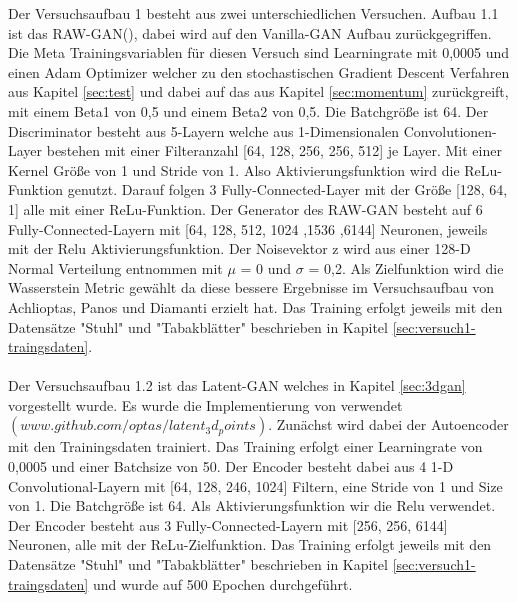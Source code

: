 \documentclass{llncs}
\begin{document}
Der Versuchsaufbau 1 besteht aus zwei unterschiedlichen Versuchen. Aufbau 1.1 ist das RAW-GAN(\cite{3dgan}), dabei wird auf den Vanilla-GAN Aufbau zurückgegriffen. Die Meta Trainingsvariablen für diesen Versuch sind Learningrate mit 0,0005 und einen Adam Optimizer welcher zu den stochastischen Gradient Descent Verfahren aus Kapitel \ref{sec:test} und dabei auf das aus Kapitel \ref{sec:momentum} zurückgreift, mit einem Beta1 von 0,5 und einem Beta2 von 0,5. Die Batchgröße ist 64. Der Discriminator besteht aus 5-Layern welche aus 1-Dimensionalen Convolutionen-Layer bestehen mit einer Filteranzahl [64, 128, 256, 256, 512] je Layer. Mit einer Kernel Größe von 1 und Stride von 1. Also Aktivierungsfunktion wird die ReLu-Funktion genutzt. Darauf folgen 3 Fully-Connected-Layer mit der Größe [128, 64, 1] alle mit einer ReLu-Funktion. Der Generator des RAW-GAN besteht auf 6 Fully-Connected-Layern mit [64, 128, 512, 1024 ,1536 ,6144] Neuronen, jeweils mit der Relu Aktivierungsfunktion. Der Noisevektor z wird aus einer 128-D Normal Verteilung entnommen mit $\mu$ = 0 und $\sigma$ =  0,2. Als Zielfunktion wird die Wasserstein Metric gewählt da diese bessere Ergebnisse im Versuchsaufbau von Achlioptas, Panos und Diamanti\cite{3dgan} erzielt hat. Das Training erfolgt jeweils mit den Datensätze "Stuhl" und "Tabakblätter" beschrieben in Kapitel \ref{sec:versuch1-traingsdaten}.
\\\\
Der Versuchsaufbau 1.2 ist das Latent-GAN welches in Kapitel \ref{sec:3dgan} vorgestellt wurde. Es wurde die Implementierung von \cite{3dgan} verwendet $(www.github.com/optas/latent_3d_points)$. Zunächst wird dabei der Autoencoder mit den Trainingsdaten trainiert. Das Training erfolgt einer Learningrate von 0,0005 und einer Batchsize von 50. Der Encoder besteht dabei aus 4 1-D Convolutional-Layern mit [64, 128, 246, 1024] Filtern, eine Stride von 1 und Size von 1. Die Batchgröße ist 64. Als Aktivierungsfunktion wir die Relu verwendet. Der Encoder besteht aus 3 Fully-Connected-Layern mit [256, 256, 6144] Neuronen, alle mit der ReLu-Zielfunktion. Das Training erfolgt jeweils mit den Datensätze "Stuhl" und "Tabakblätter" beschrieben in Kapitel \ref{sec:versuch1-traingsdaten} und wurde auf 500 Epochen durchgeführt. 
\\\\
\end{document}
